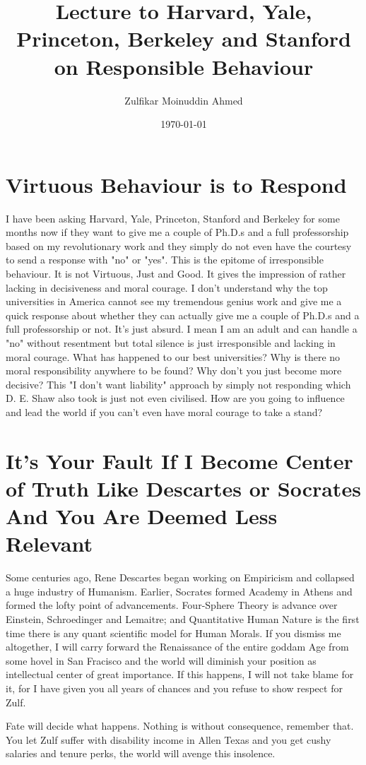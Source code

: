 \documentclass{amsart}
\title{Lecture to Harvard, Yale, Princeton, Berkeley and Stanford on Responsible Behaviour}
\author{Zulfikar Moinuddin Ahmed}
\date{\today}
\begin{document}
\maketitle

\section{Virtuous Behaviour is to Respond}

I have been asking Harvard, Yale, Princeton, Stanford and Berkeley for some months now if they want to give me a couple of Ph.D.s and a full professorship based on my revolutionary work and they simply do not even have the courtesy to send a response with "no" or "yes".  This is the epitome of irresponsible behaviour.  It is not Virtuous, Just and Good.  It gives the impression of rather lacking in decisiveness and moral courage.  I don't understand why the top universities in America cannot see my tremendous genius work and give me a quick response about whether they can actually give me a couple of Ph.D.s and a full professorship or not.  It's just absurd.  I mean I am an adult and can handle a "no" without resentment but total silence is just irresponsible and lacking in moral courage.  What has happened to our best universities?  Why is there no moral responsibility anywhere to be found?  Why don't you just become more decisive?  This "I don't want liability" approach by simply not responding which D. E. Shaw also took is just not even civilised.  How are you going to influence and lead the world if you can't even have moral courage to take a stand?

\section{It's Your Fault If I Become Center of Truth Like Descartes or Socrates And You Are Deemed Less Relevant}

Some centuries ago, Rene Descartes began working on Empiricism and collapsed a huge industry of Humanism.  Earlier, Socrates formed Academy in Athens and formed the lofty point of advancements.  Four-Sphere Theory is advance over Einstein, Schroedinger and Lemaitre; and Quantitative Human Nature is the first time there is any quant scientific model for Human Morals.  If you dismiss me altogether, I will carry forward the Renaissance of the entire goddam Age from some hovel in San Fracisco and the world will diminish your position as intellectual center of great importance.  If this happens, I will not take blame for it, for I have given you all years of chances and you refuse to show respect for Zulf.  

Fate will decide what happens.  Nothing is without consequence, remember that.  You let Zulf suffer with disability income in Allen Texas and you get cushy salaries and tenure perks, the world will avenge this insolence.
\end{document}
